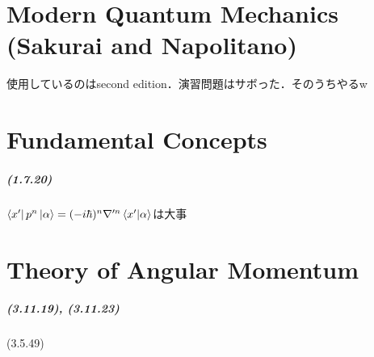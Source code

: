 \documentclass[a4paper]{ltjsreport}
\begin{document}
\chapter*{Modern Quantum Mechanics (Sakurai and Napolitano)}
使用しているのはsecond edition．演習問題はサボった．そのうちやるw

\chapter{Fundamental Concepts}
\paragraph{(1.7.20)}
$\bra{ x'} p^n \ket{\alpha} = (-i\hbar)^n\nabla'^n \braket{ x' | \alpha}$は大事

\setcounter{chapter}{2}
\chapter{Theory of Angular Momentum}
\paragraph{(3.11.19), (3.11.23)}
(3.5.49)
\end{document}
